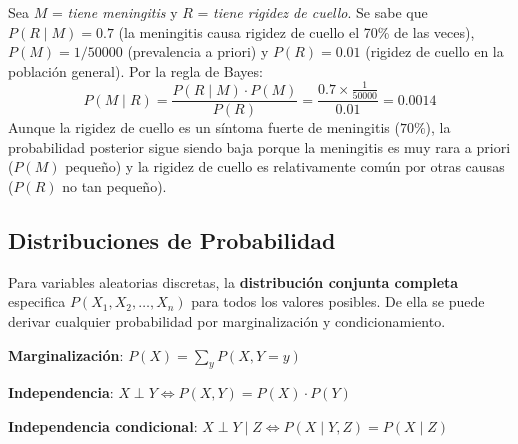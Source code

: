 \begin{example}
    Sea $M$ = \textit{tiene meningitis} y $R$ = \textit{tiene rigidez de cuello}. Se sabe que $P(R\mid M) = 0.7$ (la meningitis
    causa rigidez de cuello el 70\% de las veces), $P(M) = 1/50000$ (prevalencia a priori) y $P(R) = 0.01$ (rigidez de
    cuello en la población general). Por la regla de Bayes:
    \[
        P(M \mid R) = \frac{P(R\mid M) \cdot P(M)}{P(R)} = \frac{0.7 \times \frac{1}{50000}}{0.01} = 0.0014
    \]
    Aunque la rigidez de cuello es un síntoma fuerte de meningitis ($70\%$), la probabilidad posterior sigue siendo
    baja porque la meningitis es muy rara a priori ($P(M)$ pequeño) y la rigidez de cuello es relativamente común por
    otras causas ($P(R)$ no tan pequeño).
\end{example}

\subsection{Distribuciones de Probabilidad}

Para variables aleatorias discretas, la \textbf{distribución conjunta completa} especifica $P(X_1, X_2, \ldots, X_n)$ para todos los valores posibles. De ella se puede derivar cualquier probabilidad por marginalización y condicionamiento.

\textbf{Marginalización}: $P(X) = \sum_y P(X, Y=y)$

\textbf{Independencia}: $X \perp Y \Leftrightarrow P(X, Y) = P(X) \cdot P(Y)$

\textbf{Independencia condicional}: $X \perp Y \mid Z \Leftrightarrow P(X \mid Y, Z) = P(X \mid Z)$
